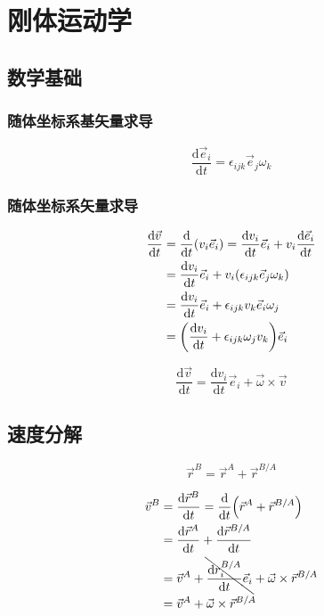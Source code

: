 \chapter{刚体运动学}

\section{数学基础}
\subsection{随体坐标系基矢量求导}
\begin{equation}
  \frac{\mathrm{d}\vec{e}_i}{\mathrm{d}t}=\epsilon_{ijk}\vec{e}_j\omega_k
\end{equation}
\subsection{随体坐标系矢量求导}
\begin{equation}
  \begin{split}
    \frac{\mathrm{d}\vec{v}}{\mathrm{d}t}&=\frac{\mathrm{d}}{\mathrm{d}t}(v_i\vec{e}_i)=\frac{\mathrm{d}v_i}{\mathrm{d}t}\vec{e}_i+v_i\frac{\mathrm{d}\vec{e}_i}{\mathrm{d}t}\\
    &=\frac{\mathrm{d}v_i}{\mathrm{d}t}\vec{e}_i+v_i(\epsilon_{ijk}\vec{e}_j\omega_k)\\
    &=\frac{\mathrm{d}v_i}{\mathrm{d}t}\vec{e}_i+\epsilon_{ijk}v_k\vec{e}_i\omega_j\\
    &=\qty(\frac{\mathrm{d}v_i}{\mathrm{d}t}+\epsilon_{ijk}\omega_jv_k)\vec{e}_i
  \end{split}
\end{equation}

\begin{equation}
  \frac{\mathrm{d}\vec{v}}{\mathrm{d}t}=\frac{\mathrm{d}v_i}{\mathrm{d}t}\vec{e}_i+\vec{\omega}\times\vec{v}
\end{equation}

\section{速度分解}
\begin{equation}
  \vec{r}^B=\vec{r}^A+\vec{r}^{B/A}
\end{equation}

\begin{equation}
  \begin{split}
    \vec{v}^B&=\frac{\mathrm{d}\vec{r}^B}{\mathrm{d}t}=\frac{\mathrm{d}}{\mathrm{d}t}\qty(\vec{r}^A+\vec{r}^{B/A})\\
    &=\frac{\mathrm{d}\vec{r}^A}{\mathrm{d}t}+\frac{\mathrm{d}\vec{r}^{B/A}}{\mathrm{d}t}\\
    &=\vec{v}^A+\bcancel{\frac{\mathrm{d}r^{B/A}_i}{\mathrm{d}t}\vec{e}_i}+\vec{\omega}\times\vec{r}^{B/A}\\
    &=\vec{v}^A+\vec{\omega}\times\vec{r}^{B/A}
  \end{split}
\end{equation}

